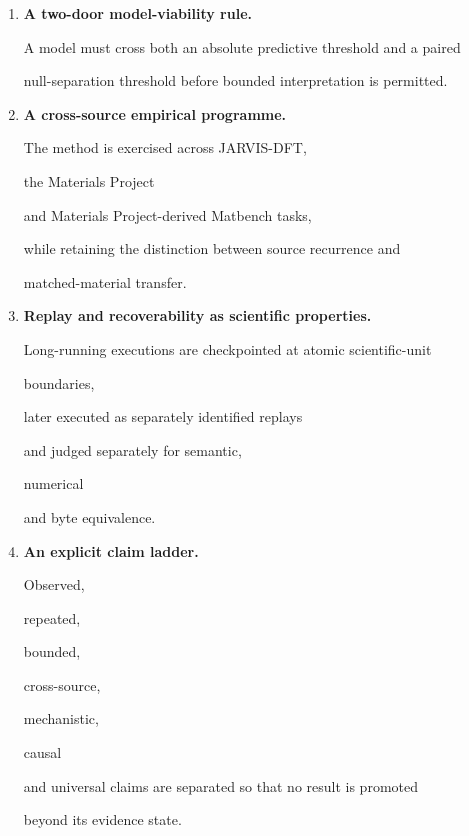 \documentclass[11pt,a4paper,oneside]{report}
\begin{document}
\begin{enumerate}
\item

\textbf{A two-door model-viability rule.}



A model must cross both an absolute predictive threshold and a paired

null-separation threshold before bounded interpretation is permitted.



\item

\textbf{A cross-source empirical programme.}



The method is exercised across JARVIS-DFT,

the Materials Project

and Materials Project-derived Matbench tasks,

while retaining the distinction between source recurrence and

matched-material transfer.



\item

\textbf{Replay and recoverability as scientific properties.}



Long-running executions are checkpointed at atomic scientific-unit

boundaries,

later executed as separately identified replays

and judged separately for semantic,

numerical

and byte equivalence.



\item

\textbf{An explicit claim ladder.}



Observed,

repeated,

bounded,

cross-source,

mechanistic,

causal

and universal claims are separated so that no result is promoted

beyond its evidence state.



\end{enumerate}
\end{document}
